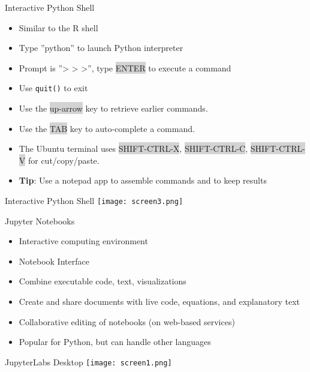 \documentclass[ignorenonframetext,xcolor=x11names]{beamer}
\begin{document}
\begin{frame}{Interactive Python Shell}
\begin{itemize}
    \item Similar to the R shell
    \item Type ''python'' to launch Python interpreter
    \item Prompt is ''> > >'', type {\footnotesize\colorbox{lightgray}{ENTER}} to execute a command
    \item Use \texttt{quit()} to exit
    \item Use the {\footnotesize\colorbox{lightgray}{up-arrow}} key to retrieve earlier commands.
    \item Use the {\footnotesize\colorbox{lightgray}{TAB}} key to auto-complete a command.
    \item The Ubuntu terminal uses {\footnotesize\colorbox{lightgray}{SHIFT-CTRL-X}}, {\footnotesize\colorbox{lightgray}{SHIFT-CTRL-C}}, {\footnotesize\colorbox{lightgray}{SHIFT-CTRL-V}} for cut/copy/paste.
    \item \textbf{Tip}: Use a notepad app to assemble commands and to keep results
\end{itemize}
\end{frame}

\begin{frame}{Interactive Python Shell}
\centering
\texttt{[image: screen3.png]}
\end{frame}

\begin{frame}{Jupyter Notebooks}
\begin{itemize}
    \item Interactive computing environment
    \item Notebook Interface
	\item Combine executable code, text, visualizations
	\item Create and share documents with live code, equations, and explanatory text
	\item Collaborative editing of notebooks (on web-based services)
	\item Popular for Python, but can handle other languages
\end{itemize}
\end{frame}

\begin{frame}{JupyterLabs Desktop}
\texttt{[image: screen1.png]}
\end{frame}
\end{document}
